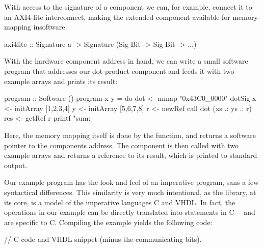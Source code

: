 \documentclass[../main.tex]{subfiles}
\begin{document}
With access to the signature of a component we can, for example, connect it to an AXI4-lite interconnect, making the extended component available for memory-mapping insoftware.


\begin{code}
axi4lite :: Signature a -> Signature (Sig Bit -> Sig Bit -> ...)
\end{code}

With the hardware component address in hand, we can write a small software program that addresses our dot product component and feeds it with two example arrays and prints its result:

\begin{code}
program :: Software ()
program x y = do
  dot <- mmap "0x43C0_0000" dotSig
  x   <- initArray [1,2,3,4]
  y   <- initArray [5,6,7,8]
  r   <- newRef
  call dot (xs .: ys .: r)
  res <- getRef r
  printf "sum: %
\end{code}

\noindent Here, the memory mapping itself is done by the  function, and returns a software pointer to the components address. The component is then called with two example arrays and returns a reference to its result, which is printed to standard output.

Our example program has the look and feel of an imperative program, sans a few syntactical differences. This similarity is very much intentional, as the library, at its core, is a model of the imperative languages C and VHDL. In fact, the operations in our example can be directly translated into statements in C--- and  are specific to C. Compiling the example yields the following code:


\begin{code}
// C code and VHDL snippet (minus the communicating bits).
\end{code}
\end{document}
